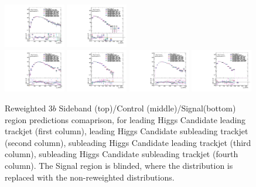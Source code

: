 \begin{figure}[htbp!]
\begin{center}
\includegraphics[width=0.24\textwidth,angle=-90]{figures/boosted/AppendixReweight/Compare/Data_ThreeTag_Control_directcompare_sublHCand_trk0_Pt_1.pdf}
\includegraphics[width=0.24\textwidth,angle=-90]{figures/boosted/AppendixReweight/Compare/Data_ThreeTag_Control_directcompare_sublHCand_trk1_Pt_1.pdf}\\
\includegraphics[width=0.24\textwidth,angle=-90]{figures/boosted/AppendixReweight/Compare/Data_ThreeTag_Signal_directcompare_leadHCand_trk0_Pt_1.pdf}
\includegraphics[width=0.24\textwidth,angle=-90]{figures/boosted/AppendixReweight/Compare/Data_ThreeTag_Signal_directcompare_leadHCand_trk1_Pt_1.pdf}
\includegraphics[width=0.24\textwidth,angle=-90]{figures/boosted/AppendixReweight/Compare/Data_ThreeTag_Signal_directcompare_sublHCand_trk0_Pt_1.pdf}
\includegraphics[width=0.24\textwidth,angle=-90]{figures/boosted/AppendixReweight/Compare/Data_ThreeTag_Signal_directcompare_sublHCand_trk1_Pt_1.pdf}\\
\caption{Reweighted $3b$ Sideband (top)/Control (middle)/Signal(bottom) region predictions comaprison, for leading Higgs Candidate leading trackjet \pt (first column),  leading Higgs Candidate subleading trackjet \pt (second column), subleading Higgs Candidate leading trackjet \pt (third column), subleading Higgs Candidate subleading trackjet \pt (fourth column). The Signal region is blinded, where the distribution is replaced with the non-reweighted distributions.}
\label{fig:app-rw-comp-3b-trkjet}
\end{center}
\end{figure}

